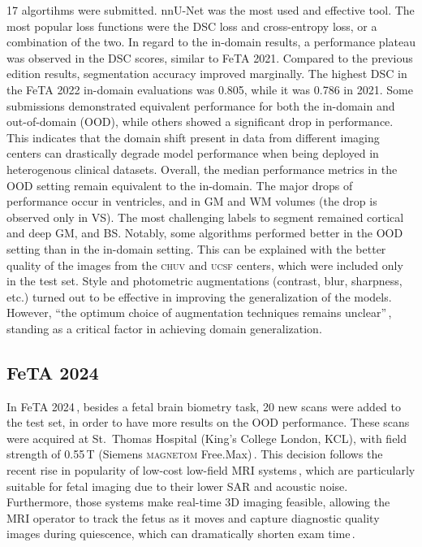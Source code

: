 17 algortihms were submitted. nnU-Net was the most used and effective tool. The most popular loss functions were the DSC loss and cross-entropy loss, or a combination of the two. In regard to the in-domain results, a performance plateau was observed in the DSC scores, similar to FeTA 2021. Compared to the previous edition results, segmentation accuracy improved marginally. The highest DSC in the FeTA 2022 in-domain evaluations was 0.805, while it was 0.786 in 2021. Some submissions demonstrated equivalent performance for both the in-domain and out-of-domain (OOD), while others showed a significant drop in performance. This indicates that the domain shift present in data from different imaging centers can drastically degrade model performance when being deployed in heterogenous clinical datasets. Overall, the median performance metrics in the OOD setting remain equivalent to the in-domain. The major drops of performance occur in ventricles, and in GM and WM volumes (the drop is observed only in VS). The most challenging labels to segment remained cortical and deep GM, and BS. Notably, some algorithms performed better in the OOD setting than in the in-domain setting. This can be explained with the better quality of the images from the \textsc{chuv} and \textsc{ucsf} centers, which were included only in the test set. Style and photometric augmentations (contrast, blur, sharpness, etc.) turned out to be effective in improving the generalization of the models. However, \enquote{the optimum choice of augmentation techniques remains unclear}\,\cite{FeTA2022_review}, standing as a critical factor in achieving domain generalization.

\subsection{FeTA 2024}

In FeTA 2024\,\cite{FeTA2024}, besides a fetal brain biometry task, 20 new scans were added to the test set, in order to have more results on the OOD performance. These scans were acquired at St.\ Thomas Hospital (King's College London, KCL), with field strength of 0.55\,T (Siemens \textsc{magnetom} Free.Max)\,\cite{FeTA2024_paper}. This decision follows the recent rise in popularity of low-cost low-field MRI systems\,\cite{Aviles2023}, which are particularly suitable for fetal imaging due to their lower SAR and acoustic noise. Furthermore, those systems make real-time 3D imaging feasible, allowing the MRI operator to track the fetus as it moves and capture diagnostic quality images during quiescence, which can dramatically shorten exam time\,\cite{Ponrartana2023}.


